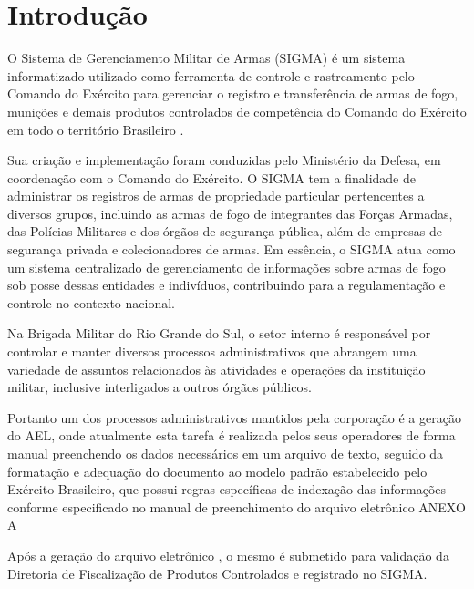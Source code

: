 \chapter{Introdução}

O Sistema de Gerenciamento Militar de Armas (SIGMA) é um sistema informatizado utilizado como ferramenta de controle e rastreamento pelo Comando do Exército para gerenciar o registro e transferência de armas de fogo, munições e demais produtos controlados de competência do Comando do Exército em todo o território Brasileiro 
\cite{ExércitoBrasileiro}.

Sua criação e implementação foram conduzidas pelo Ministério da Defesa, em coordenação com o Comando do Exército. O SIGMA tem a finalidade de administrar os registros de armas de propriedade particular pertencentes a diversos grupos, incluindo as armas de fogo de integrantes das Forças Armadas, das Polícias Militares e dos órgãos de segurança pública, além de empresas de segurança privada e colecionadores de armas. Em essência, o SIGMA atua como um sistema centralizado de gerenciamento de informações sobre armas de fogo sob posse dessas entidades e indivíduos, contribuindo para a regulamentação e controle no contexto nacional.
\cite{ExércitoBrasileiro}


Na Brigada Militar do Rio Grande do Sul, o setor interno é responsável por controlar e 
manter diversos processos administrativos que abrangem uma variedade de assuntos relacionados às atividades e operações da instituição militar, inclusive interligados a outros órgãos públicos. 
\cite{bmDepartamentoAdministrativo}

Portanto um dos processos administrativos mantidos pela corporação é a geração do AEL, onde atualmente esta tarefa é realizada pelos seus operadores de forma manual preenchendo os dados necessários em um arquivo de texto, seguido da formatação e adequação do documento ao modelo padrão estabelecido pelo Exército Brasileiro, que possui regras específicas de indexação das informações conforme especificado no manual de preenchimento do arquivo eletrônico 
ANEXO A

Após a geração do arquivo eletrônico , o mesmo é submetido para validação da Diretoria de Fiscalização de Produtos Controlados e registrado no SIGMA.


